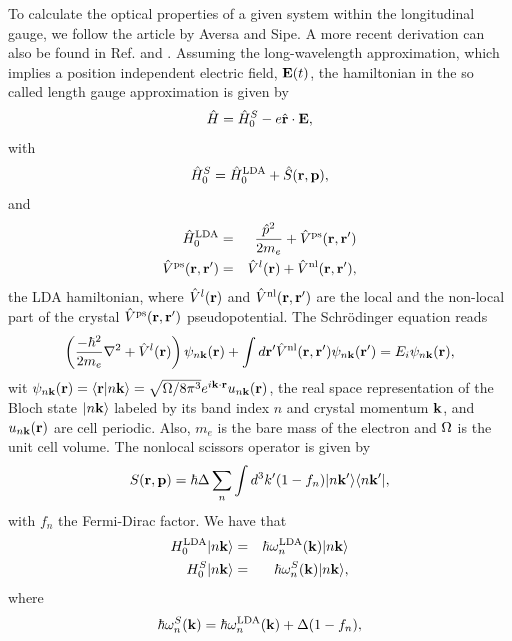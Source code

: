 \documentclass[floatfix,prb,aps,superscriptaddress,11pt,preprint]{revtex4}
\begin{document}
To calculate the optical properties of a given system
within the longitudinal gauge, we follow the article by
Aversa and Sipe.\cite{aversaPRB95} A more recent derivation can also be
found in
Ref. \cite{sipe_second-order_2000} and \cite{lambrecht_band_2000}.
 Assuming the long-wavelength approximation,
which implies a position independent electric field, 
$\mathbf{E}(t)$,  
the hamiltonian in the so called length gauge approximation
is given by
\begin{equation}\label{ache}
\hat{H}=\hat{H}^S_0-e \hat{\mathbf{r}} \cdot \mathbf{E},
\end{equation}
with
\begin{eqnarray}\label{ache.1}
\hat H^S_0=\hat H^{\mathrm{LDA}}_0
 + \hat S(\mathbf{r},\mathbf{p})
,
\end{eqnarray} 
and
\begin{eqnarray}\label{ache.2}
\hat H^{\mathrm{LDA}}_0&=&\frac{\hat p^2}{2m_e}  + \hat V^{\mathrm{ps}}(\mathbf{r},\mathbf{r}')
\nonumber\\
\hat V^{\mathrm{ps}}(\mathbf{r},\mathbf{r}')
&=&\hat V^l(\mathbf{r}) + \hat V^{\mathrm{nl}}(\mathbf{r},\mathbf{r}')
,
\end{eqnarray}  
the LDA hamiltonian, 
where $\hat V^l(\mathbf{r})$ and $\hat V^{\mathrm{nl}}(\mathbf{r},\mathbf{r}')$ are the local and
the non-local part of the  
crystal $\hat V^{\mathrm{ps}}(\mathbf{r},\mathbf{r}')$ pseudopotential.
The Schr\"odinger equation reads
\begin{eqnarray}\label{ache.4}
\left(
\frac{-\hbar^2}{2m_e}\nabla^2
 + \hat V^l(\mathbf{r})\right)\psi_{n\mathbf{k}}(\mathbf{r})
 + \int d\mathbf{r}'\hat V^{\mathrm{nl}}(\mathbf{r},\mathbf{r}')\psi_{n\mathbf{k}}(\mathbf{r}')
=E_i\psi_{n\mathbf{k}}(\mathbf{r})
,
\end{eqnarray} 
wit
$\psi_{n\mathbf{k}}(\mathbf{r})=\langle {\mathbf{r}} | {n\mathbf{k}} \rangle=\sqrt{\Omega/8\pi^3}e^{i\mathbf{k}\cdot\mathbf{r}}u_{n\mathbf{k}}(\mathbf{r})$,
 the real space
representation of the Bloch state $| n\mathbf{k} \rangle$
labeled
by  its
band index $n$ and crystal momentum $\mathbf{k}$, and
$u_{n\mathbf{k}}(\mathbf{r})$ are cell periodic. 
Also, 
$m_e$ is the 
bare mass of the 
electron and
$\Omega$ is the unit cell volume. 
The nonlocal scissors operator is given by 
\begin{equation}\label{chon.0}
S(\mathbf{r},\mathbf{p})=\hbar\Delta\sum_n\int d^3k'(1-f_n) | n\mathbf{k}' \rangle\langle n\mathbf{k}' |
,
\end{equation}
with $f_n$ the Fermi-Dirac factor.
We have that
\begin{eqnarray}\label{chon.1}  
H^{\mathrm{LDA}}_0| n\mathbf{k} \rangle&=&\hbar\omega^{\mathrm{LDA}}_n(\mathbf{k})| n\mathbf{k} \rangle
\nonumber\\
H^S_0| n\mathbf{k} \rangle&=&\hbar\omega^S_n(\mathbf{k})| n\mathbf{k} \rangle
,
\end{eqnarray} 
where 
\begin{eqnarray}\label{chon.78}
\hbar\omega^S_n(\mathbf{k})=\hbar\omega^{\mathrm{LDA}}_n(\mathbf{k})+\Delta(1-f_n)
,
\end{eqnarray}
\end{document}
